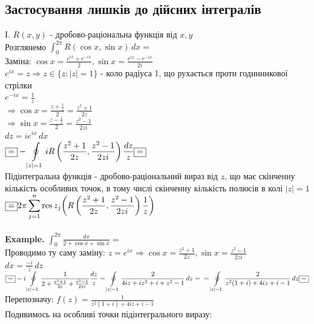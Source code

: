 \documentclass{math_library}
\begin{document}
\subsection{Застосування лишків до дійсних інтегралів}
I. $R(x,y)$ - дробово-раціональна функція від $x,y$\\
Розглянемо $\displaystyle \int_{0}^{2\pi} R(\cos x, \sin x) \,dx \boxed{=}$\\
Заміна: $\displaystyle \cos x = \frac{e^{ix}+e^{-ix}}{2}, \sin x = \frac{e^{ix}-e^{-ix}}{2i}$\\
$\displaystyle e^{ix} = z \Rightarrow z \in \{z: |z| = 1\}$ - коло радіуса 1, що рухається проти годинникової стрілки\\
$\displaystyle e^{-ix} = \frac{1}{z}$\\
$\Rightarrow \displaystyle \cos x = \frac{z+\frac{1}{z}}{2} = \frac{z^2+1}{2z}$\\
$\Rightarrow \displaystyle \sin x = \frac{z-\frac{1}{z}}{2} = \frac{z^2-1}{2zi}$\\
$dz = i e^{ix}\,dx$\\
$\displaystyle \boxed{=} -\oint\displaylimits_{|z|=1} iR\left(\frac{z^2+1}{2z}, \frac{z^2-1}{2zi}\right) \frac{dz}{z} \boxed{=}$\\
Підінтегральна функція - дробово-раціональний вираз від $z$, що має скінченну кількість особливих точок, в тому числі скінченну кількість полюсів в колі $|z|=1$\\
$\displaystyle \boxed{=} 2 \pi \sum_{j=1}^n \operatorname*{res}{z_j}{\left(R\left(\frac{z^2+1}{2z}, \frac{z^2-1}{2zi}\right) \frac{1}{z}\right)}$\\
\bigskip \\
\textbf{Example.} $\displaystyle \int_{0}^{2\pi} \frac{dx}{2 + \cos x + \sin x} \boxed{=}$\\
Проводимо ту саму заміну:  $\displaystyle z = e^{ix} \Rightarrow \cos x = \frac{z^2+1}{2z}, \sin x = \frac{z^2-1}{2zi}$\\
$\displaystyle dx = \frac{-i}{z} \,dz$\\
$\displaystyle \boxed{=} -i\oint\displaylimits_{|z|=1} \frac{1}{2+ \frac{z^2+1}{2z} + \frac{z^2-1}{2zi}} \frac{dz}{z} = \oint\displaylimits_{|z|=1} \frac{2}{4iz + iz^2 + i + z^2 - 1} \,dz = \\ = \oint\displaylimits_{|z|=1} \frac{2}{z^2(1+i) + 4iz + i-1} \,dz \boxed{=}$\\
Перепозначу: $\displaystyle f(z) = \frac{1}{z^2(1+i)+4iz+i-1}$\\
Подивимось на особливі точки підінтегрального виразу:\\
\end{document}

